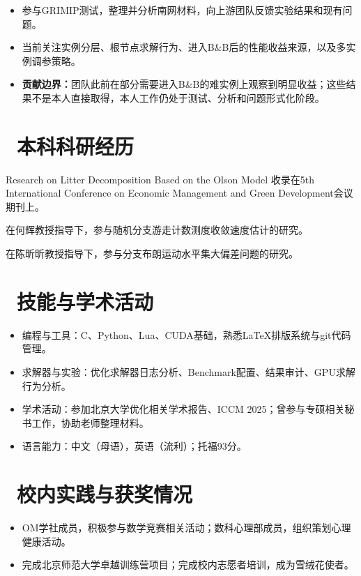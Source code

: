 \documentclass{resume}
\begin{document}
\begin{itemize}
  \item 参与GRIMIP测试，整理并分析南网材料，向上游团队反馈实验结果和现有问题。
  \item 当前关注实例分层、根节点求解行为、进入B\&B后的性能收益来源，以及多实例调参策略。
  \item \textbf{贡献边界：}团队此前在部分需要进入B\&B的难实例上观察到明显收益；这些结果不是本人直接取得，本人工作仍处于测试、分析和问题形式化阶段。
\end{itemize}

\section{\faFlask\ 本科科研经历}
Research on Litter Decomposition Based on the Olson Model 收录在5th International Conference on Economic Management and Green Development会议期刊上。

在何辉教授指导下，参与随机分支游走计数测度收敛速度估计的研究。

在陈昕昕教授指导下，参与分支布朗运动水平集大偏差问题的研究。

\section{\faCogs\ 技能与学术活动}
\begin{itemize}
  \item 编程与工具：C、Python、Lua、CUDA基础，熟悉\LaTeX 排版系统与git代码管理。
  \item 求解器与实验：优化求解器日志分析、Benchmark配置、结果审计、GPU求解行为分析。
  \item 学术活动：参加北京大学优化相关学术报告、ICCM 2025；曾参与专硕相关秘书工作，协助老师整理材料。
  \item 语言能力：中文（母语），英语（流利）；托福93分。
\end{itemize}

\section{\faBell\ 校内实践与获奖情况}
\begin{itemize}
  \item OM学社成员，积极参与数学竞赛相关活动；数科心理部成员，组织策划心理健康活动。
  \item 完成北京师范大学卓越训练营项目；完成校内志愿者培训，成为雪绒花使者。
\end{itemize}

\end{document}
